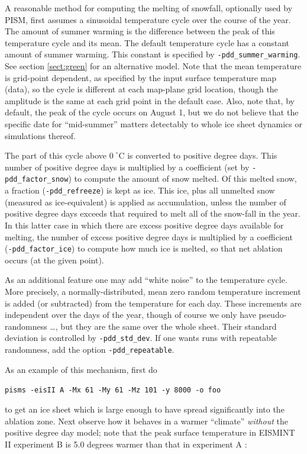 \documentclass[11pt,final]{amsart}
\begin{document}
A reasonable method for computing the melting of snowfall, optionally used by PISM, first assumes a sinusoidal temperature cycle over the course of the year.  The amount of summer warming is the difference between the peak of this temperature cycle and its mean.  The default temperature cycle has a constant amount of summer warming.  This constant is specified by \verb|-pdd_summer_warming|.  See section \ref{sect:green} for an alternative model.  Note that the mean temperature is grid-point dependent, as specified by the input surface temperature map (data), so the cycle is different at each map-plane grid location, though the amplitude is the same at each grid point in the default case.  Also, note that, by default, the peak of the cycle occurs on August 1, but we do not believe that the specific date for ``mid-summer'' matters detectably to whole ice sheet dynamics or simulations thereof.

The part of this cycle above $0\!\phantom{|}^\circ \text{C}$ is converted to positive degree days.  This number of positive degree days is multiplied by a coefficient (set by \verb|-pdd_factor_snow|) to compute the amount of snow melted.  Of this melted snow, a fraction (\verb|-pdd_refreeze|) is kept as ice.  This ice, plus all unmelted snow (measured as ice-equivalent) is applied as accumulation, unless the number of positive degree days exceeds that required to melt all of the snow-fall in the year.  In this latter case in which there are excess positive degree days available for melting, the number of excess positive degree days is multiplied by a coefficient (\verb|-pdd_factor_ice|) to compute how much ice is melted, so that net ablation occurs (at the given point).

As an additional feature one may add ``white noise'' to the temperature cycle.  More precisely, a normally-distributed, mean zero random temperature increment is added (or subtracted) from the temperature for each day.  These increments are independent over the days of the year, though of course we only have pseudo-randomness \dots, but they are the same over the whole sheet.  Their standard deviation is controlled by \verb|-pdd_std_dev|.  If one wants runs with repeatable randomness, add the option \verb|-pdd_repeatable|.

As an example of this mechanism, first do

\verb|pisms -eisII A -Mx 61 -My 61 -Mz 101 -y 8000 -o foo|

\noindent to get an ice sheet which is large enough to have spread significantly into the ablation zone.  Next observe how it behaves in a warmer ``climate'' \emph{without} the positive degree day model; note that the peak surface temperature in EISMINT II experiment B is 5.0 degrees warmer than that in experiment A \cite{EISMINT00}:
\end{document}
